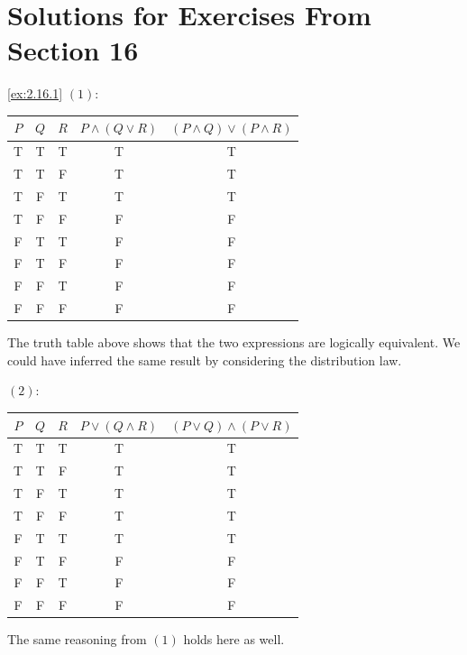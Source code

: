 \section*{Solutions for Exercises From Section 16}
\begin{solution}\label{sol:2.16.1}\ref{ex:2.16.1}
    $(1)$:
    \begin{table}[H]
        \centering
        \begin{tabular}{ccccc}
            \toprule
            $P$ & $Q$ & $R$ & $P\land(Q\lor R)$ & $(P\land Q)\lor(P\land R)$\\
            \midrule
            T & T & T & T & T\\
            T & T & F & T & T\\
            T & F & T & T & T\\
            T & F & F & F & F\\
            F & T & T & F & F\\
            F & T & F & F & F\\
            F & F & T & F & F\\
            F & F & F & F & F\\
            \bottomrule
        \end{tabular}
    \end{table}
    The truth table above shows that the two expressions are logically equivalent. We could have inferred the same result by considering the distribution law. 

    $(2)$: 
    \begin{table}[H]
        \centering
        \begin{tabular}{ccccc}
            \toprule
            $P$ & $Q$ & $R$ & $P\lor (Q\land R)$ & $(P\lor Q)\land (P\lor R)$\\
            \midrule
            T & T & T & T & T\\
            T & T & F & T & T\\
            T & F & T & T & T\\
            T & F & F & T & T\\
            F & T & T & T & T\\
            F & T & F & F & F\\
            F & F & T & F & F\\
            F & F & F & F & F\\
            \bottomrule
        \end{tabular}
    \end{table}
    The same reasoning from $(1)$ holds here as well. 


\end{solution}
